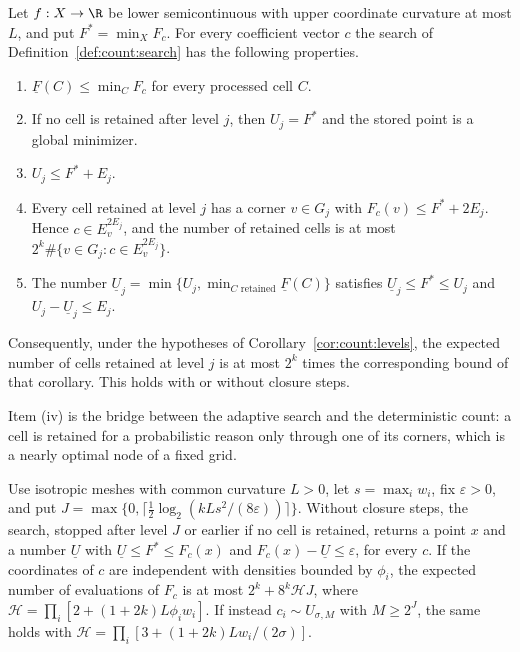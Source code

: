 \begin{theorem}\label{thm:count:cells}
Let $f:X\to\R$ be lower semicontinuous with upper coordinate curvature at
most $L$, and put $F^*=\min_XF_c$. For every coefficient vector $c$ the
search of Definition~\ref{def:count:search} has the following properties.
\begin{enumerate}[label=(\roman*)]
\item $\underline F(C)\le\min_CF_c$ for every processed cell $C$.
\item If no cell is retained after level $j$, then $U_j=F^*$ and the stored
 point is a global minimizer.
\item $U_j\le F^*+E_j$.
\item Every cell retained at level $j$ has a corner $v\in G_j$ with
 $F_c(v)\le F^*+2E_j$. Hence $c\in E_v^{2E_j}$, and the number of retained
 cells is at most $2^k\#\{v\in G_j:c\in E_v^{2E_j}\}$.
\item The number $\underline U_j=\min\{U_j,\min_{C\text{ retained}}\underline F(C)\}$
 satisfies $\underline U_j\le F^*\le U_j$ and $U_j-\underline U_j\le E_j$.
\end{enumerate}
Consequently, under the hypotheses of Corollary~\ref{cor:count:levels}, the
expected number of cells retained at level $j$ is at most $2^k$ times the
corresponding bound of that corollary. This holds with or without closure
steps.
\end{theorem}

Item (iv) is the bridge between the adaptive search and the deterministic
count: a cell is retained for a probabilistic reason only through one of its
corners, which is a nearly optimal node of a fixed grid.

\begin{corollary}\label{cor:count:approx}
Use isotropic meshes with common curvature $L>0$, let $s=\max_iw_i$, fix
$\varepsilon>0$, and put
$J=\max\{0,\lceil\frac12\log_2(kLs^2/(8\varepsilon))\rceil\}$. Without
closure steps, the search, stopped after level $J$ or earlier if no cell is
retained, returns a point $x$ and a number $\underline U$ with
$\underline U\le F^*\le F_c(x)$ and $F_c(x)-\underline U\le\varepsilon$, for
every $c$. If the coordinates of $c$ are independent with densities bounded
by $\phi_i$, the expected number of evaluations of $F_c$ is at most
$2^k+8^k\mathcal HJ$, where $\mathcal H=\prod_i[2+(1+2k)L\phi_iw_i]$. If
instead $c_i\sim U_{\sigma,M}$ with $M\ge2^J$, the same holds with
$\mathcal H=\prod_i[3+(1+2k)Lw_i/(2\sigma)]$.
\end{corollary}


